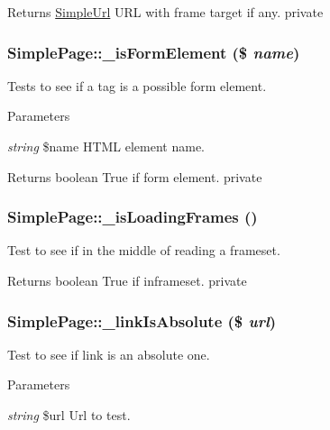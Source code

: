 \begin{DoxyReturn}{Returns}
\hyperlink{class_simple_url}{SimpleUrl} URL with frame target if any.  private 
\end{DoxyReturn}
\hypertarget{class_simple_page_a6afeda6149d9f5a2016833a181205aa4}{
\subsubsection[{\_\-isFormElement}]{\setlength{\rightskip}{0pt plus 5cm}SimplePage::\_\-isFormElement (\$ {\em name})}}
\label{class_simple_page_a6afeda6149d9f5a2016833a181205aa4}
Tests to see if a tag is a possible form element. 
\begin{DoxyParams}{Parameters}
\item[{\em string}]\$name HTML element name. \end{DoxyParams}
\begin{DoxyReturn}{Returns}
boolean True if form element.  private 
\end{DoxyReturn}
\hypertarget{class_simple_page_ac687a34df486e9502685c2d79cc846b4}{
\subsubsection[{\_\-isLoadingFrames}]{\setlength{\rightskip}{0pt plus 5cm}SimplePage::\_\-isLoadingFrames ()}}
\label{class_simple_page_ac687a34df486e9502685c2d79cc846b4}
Test to see if in the middle of reading a frameset. \begin{DoxyReturn}{Returns}
boolean True if inframeset.  private 
\end{DoxyReturn}
\hypertarget{class_simple_page_a22c888195e0976743dd43b4d98d8abbe}{
\subsubsection[{\_\-linkIsAbsolute}]{\setlength{\rightskip}{0pt plus 5cm}SimplePage::\_\-linkIsAbsolute (\$ {\em url})}}
\label{class_simple_page_a22c888195e0976743dd43b4d98d8abbe}
Test to see if link is an absolute one. 
\begin{DoxyParams}{Parameters}
\item[{\em string}]\$url Url to test. \end{DoxyParams}

